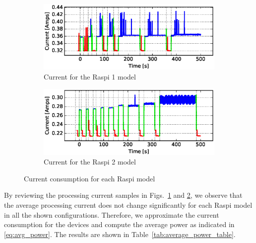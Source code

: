 \begin{figure}
    \centering
    \begin{subfigure}[b]{0.475\textwidth}
        \centering
        \includegraphics[width=1.1\textwidth]{images/06_06_2016/current_vs_sec_raspberry_change_gen_from_-10sec_to_500sec.eps}
        \caption[]%
        {{\small Current for the \ac{Raspi} 1 model}}
        \label{fig:current_rasp1}
    \end{subfigure}
    \hfill
    \begin{subfigure}[b]{0.475\textwidth}
        \centering
        \includegraphics[width=1.1\textwidth]{images/06_06_2016/current_vs_sec_raspberry2_change_gen_from_-10sec_to_500sec.eps}
        \caption[]%
        {{\small Current for the \ac{Raspi} 2 model}}
        \label{fig:current_rasp2}
    \end{subfigure}

    \caption[]
    {\small Current consumption for each \ac{Raspi} model}
    \label{fig:current_rasp}
\end{figure}
%
By reviewing the processing current samples in Figs.~\ref{fig:current_rasp1}
and \ref{fig:current_rasp2}, we observe that the average processing current
does not change significantly for each \ac{Raspi} model in all the shown
configurations. Therefore, we approximate the current consumption
for the devices and compute the average power as indicated in
\eqref{eq:avg_power}. The results are shown in
Table~\ref{tab:average_power_table}.

